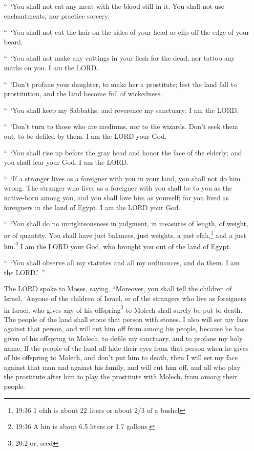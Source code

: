 \myverse{}“ ‘You shall not eat any meat with the blood still in it. You
shall not use enchantments, nor practice sorcery.


\myverse{}“ ‘You shall not cut the hair on the sides of your head or clip
off the edge of your beard.


\myverse{}“ ‘You shall not make any cuttings in your flesh for the dead,
nor tattoo any marks on you. I am the LORD.


\myverse{}“ ‘Don’t profane your daughter, to make her a prostitute; lest
the land fall to prostitution, and the land become full of wickedness.


\myverse{}“ ‘You shall keep my Sabbaths, and reverence my sanctuary; I
am the LORD.


\myverse{}“ ‘Don’t turn to those who are mediums, nor to the wizards. Don’t
seek them out, to be defiled by them. I am the LORD your God.


\myverse{}“ ‘You shall rise up before the gray head and honor the face
of the elderly; and you shall fear your God. I am the LORD.


\myverse{}“ ‘If a stranger lives as a foreigner with you in your land,
you shall not do him wrong.
\myverse{}The stranger who lives as a foreigner with you shall be to you as the native-born
among you, and you shall love him as yourself; for you lived as foreigners in the land of Egypt. I am
the LORD your God.


\myverse{}“ ‘You shall do no unrighteousness in judgment, in measures of
length, of weight, or of quantity.
\myverse{}You shall have just balances, just weights, a just efah,\footnote{19:36 1 efah is about 22 liters or about 2/3 of a bushel} and a just hin.\footnote{19:36 A hin is about 6.5 liters or 1.7 gallons.} I am the LORD your God, who brought you out
of the land of Egypt.


\myverse{}“ ‘You shall observe all my statutes and all my ordinances, and
do them. I am the LORD.’ ”


\mychapter{} \myverse*{}The LORD spoke to Moses, saying,
\myverse{}“Moreover, you shall tell the children of Israel, ‘Anyone of the children of
Israel, or of the strangers who live as foreigners in Israel, who gives any of his offspring\footnote{20:2 or, seed} to Molech shall surely be put to death. The people of the land shall stone
that person with stones.
\myverse{}I also will set my face against that person, and will cut him off from among
his people, because he has given of his offspring to Molech, to defile my sanctuary, and to profane my
holy name.
\myverse{}If the people of the land all hide their eyes from that person when he gives
of his offspring to Molech, and don’t put him to death,
\myverse{}then I will set my face against that man and against his family, and will cut
him off, and all who play the prostitute after him to play the prostitute with Molech, from among their
people.


